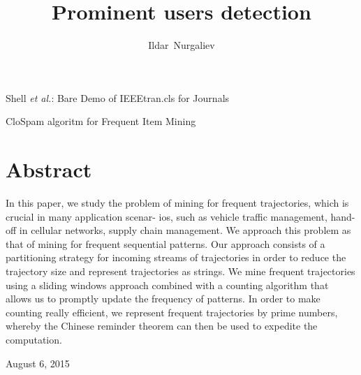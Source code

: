\documentclass[journal]{IEEEtran}
\begin{document}
%
\title{Prominent users detection}

\author{Ildar~Nurgaliev}


%
{Shell \MakeLowercase{\textit{et al.}}: Bare Demo of IEEEtran.cls for Journals}

\maketitle

\begin{IEEEkeywords}
CloSpam algoritm for Frequent Item Mining
\end{IEEEkeywords}

\IEEEpeerreviewmaketitle

\section{Abstract}
In this paper, we study the problem of mining for frequent trajectories, which is crucial in many application scenar- ios, such as vehicle traffic management, hand-off in cellular networks, supply chain management. We approach this problem as that of mining for frequent sequential patterns. Our approach consists of a partitioning strategy for incoming streams of trajectories in order to reduce the trajectory size and represent trajectories as strings. We mine frequent trajectories using a sliding windows approach combined with a counting algorithm that allows us to promptly update the frequency of patterns. In order to make counting really efficient, we represent frequent trajectories by prime numbers, whereby the Chinese reminder theorem can then be used to expedite the computation.

\hfill August 6, 2015
\end{document}
